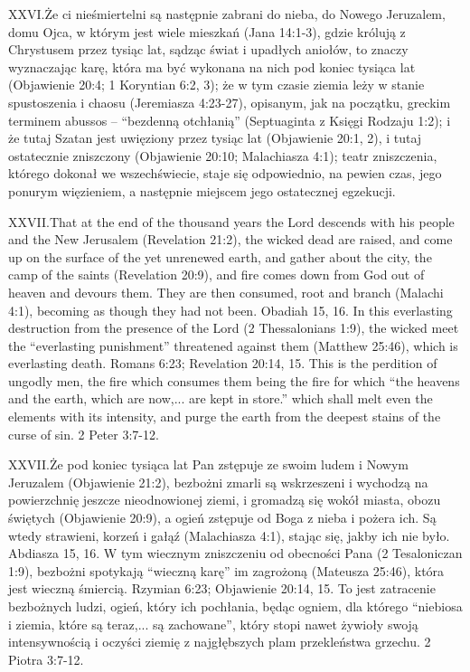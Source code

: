 \lettrine{XXVI.} Że ci nieśmiertelni są następnie zabrani do nieba, do Nowego Jeruzalem, domu Ojca, w którym jest wiele mieszkań (Jana 14:1-3), gdzie królują z Chrystusem przez tysiąc lat, sądząc świat i upadłych aniołów, to znaczy wyznaczając karę, która ma być wykonana na nich pod koniec tysiąca lat (Objawienie 20:4; 1 Koryntian 6:2, 3); że w tym czasie ziemia leży w stanie spustoszenia i chaosu (Jeremiasza 4:23-27), opisanym, jak na początku, greckim terminem abussos – “bezdenną otchłanią” (Septuaginta z Księgi Rodzaju 1:2); i że tutaj Szatan jest uwięziony przez tysiąc lat (Objawienie 20:1, 2), i tutaj ostatecznie zniszczony (Objawienie 20:10; Malachiasza 4:1); teatr zniszczenia, którego dokonał we wszechświecie, staje się odpowiednio, na pewien czas, jego ponurym więzieniem, a następnie miejscem jego ostatecznej egzekucji.


\lettrine{XXVII.} That at the end of the thousand years the Lord descends with his people and the New Jerusalem (Revelation 21:2), the wicked dead are raised, and come up on the surface of the yet unrenewed earth, and gather about the city, the camp of the saints (Revelation 20:9), and fire comes down from God out of heaven and devours them. They are then consumed, root and branch (Malachi 4:1), becoming as though they had not been. Obadiah 15, 16. In this everlasting destruction from the presence of the Lord (2 Thessalonians 1:9), the wicked meet the “everlasting punishment” threatened against them (Matthew 25:46), which is everlasting death. Romans 6:23; Revelation 20:14, 15. This is the perdition of ungodly men, the fire which consumes them being the fire for which “the heavens and the earth, which are now,... are kept in store.” which shall melt even the elements with its intensity, and purge the earth from the deepest stains of the curse of sin. 2 Peter 3:7-12.


\lettrine{XXVII.} Że pod koniec tysiąca lat Pan zstępuje ze swoim ludem i Nowym Jeruzalem (Objawienie 21:2), bezbożni zmarli są wskrzeszeni i wychodzą na powierzchnię jeszcze nieodnowionej ziemi, i gromadzą się wokół miasta, obozu świętych (Objawienie 20:9), a ogień zstępuje od Boga z nieba i pożera ich. Są wtedy strawieni, korzeń i gałąź (Malachiasza 4:1), stając się, jakby ich nie było. Abdiasza 15, 16. W tym wiecznym zniszczeniu od obecności Pana (2 Tesaloniczan 1:9), bezbożni spotykają “wieczną karę” im zagrożoną (Mateusza 25:46), która jest wieczną śmiercią. Rzymian 6:23; Objawienie 20:14, 15. To jest zatracenie bezbożnych ludzi, ogień, który ich pochłania, będąc ogniem, dla którego “niebiosa i ziemia, które są teraz,... są zachowane”, który stopi nawet żywioły swoją intensywnością i oczyści ziemię z najgłębszych plam przekleństwa grzechu. 2 Piotra 3:7-12.


